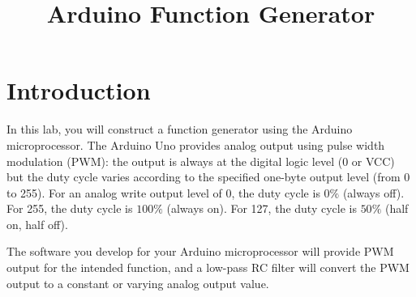 \documentclass[12pt]{article}
\begin{document}
\title{Arduino Function Generator} 

\maketitle

\section{Introduction}

In this lab, you will construct a function generator using the Arduino
microprocessor.  The Arduino Uno provides analog output using pulse
width modulation (PWM):  the output is always at the digital logic level (0
or VCC) but the duty cycle varies according to the specified one-byte
output level (from 0 to 255).  For an analog write output level of 0,
the duty cycle is $0\%$ (always off).  For 255, the duty cycle is
$100\%$ (always on).  For 127, the duty cycle is $50\%$ (half on, half
off).

The software you develop for your Arduino microprocessor will provide 
PWM output for the intended function, and a low-pass RC filter will convert 
the PWM output to a constant or varying analog output value.
\end{document}
